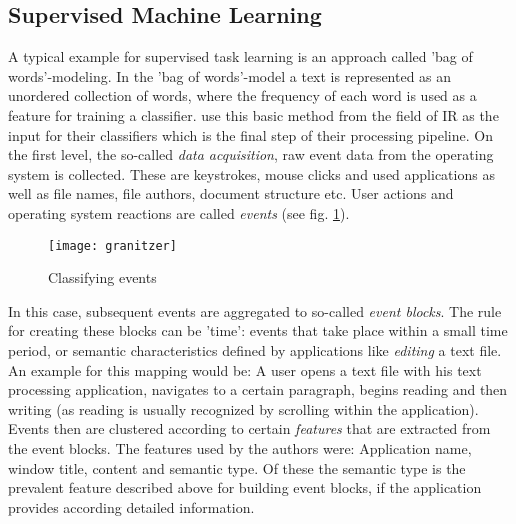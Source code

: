 \subsection{Supervised Machine Learning}
A typical example for supervised task learning is an approach called 'bag of words'-modeling. In the 'bag of words'-model a text is represented as an unordered collection of words, where the frequency of each word is used as a feature for training a classifier. \cite{granitzer2008analysis} use this basic method from the field of \ac{IR} as the input for their classifiers which is the final step of their processing pipeline. On the first level, the so-called \textit{data acquisition}, raw event data from the operating system is collected. These are keystrokes, mouse clicks and used applications as well as file names, file authors, document structure etc. User actions and operating system reactions are called \textit{events} (see fig. \ref{fig2}).  
\begin{figure}[ht]
	\centering
  \texttt{[image: granitzer]}
	\caption{Classifying events}
	\label{fig2}
\end{figure}

In this case, subsequent events are aggregated to so-called \textit{event blocks}. The rule for creating these blocks can be 'time': events that take place within a small time period, or semantic characteristics defined by applications like \textit{editing} a text file. An example for this mapping would be: A user opens a text file with his text processing application, navigates to a certain paragraph, begins reading and then writing (as reading is usually recognized by scrolling within the application). Events then are clustered according to certain \textit{features} that are extracted from the event blocks. The features used by the authors were: Application name, window title, content and semantic type. Of these the semantic type is the prevalent feature described above for building event blocks, if the application provides according detailed information. 



  
